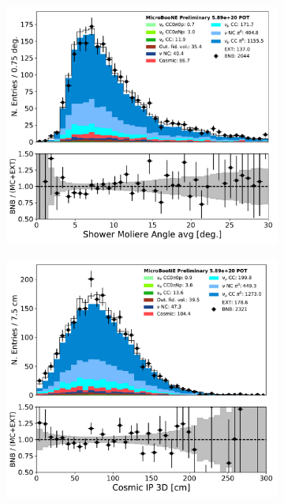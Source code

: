 \begin{figure}[H] 
\begin{center}
    \begin{subfigure}[b]{0.3\textwidth}
    \centering
    \includegraphics[width=1.00\textwidth]{pi0/nueselection/shrmoliereavg_03112020_ALL_scaled.pdf}
    \caption{}
    \end{subfigure}
    \begin{subfigure}[b]{0.3\textwidth}
    \centering
    \includegraphics[width=1.00\textwidth]{pi0/nueselection/CosmicIPAll3D_03112020_ALL_scaled.pdf}
    \caption{}
    \end{subfigure}
\caption{}
\label{fig:pi0:nueselection:trkvar2}
\end{center}
\end{figure}